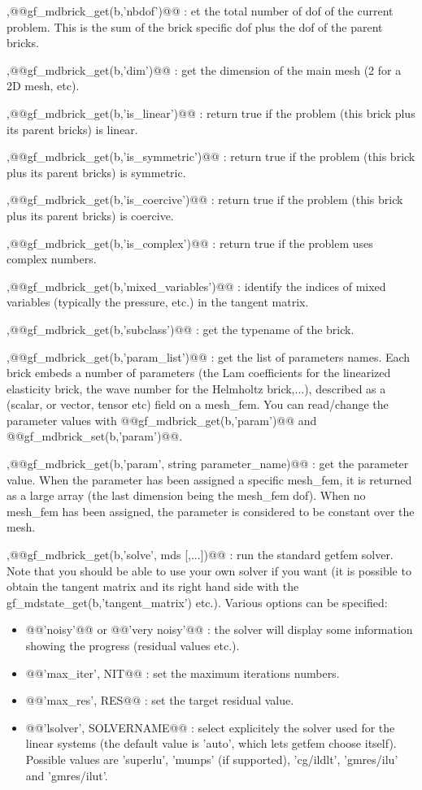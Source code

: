 \begin{cmddescription}    
  \sep{@@gf_mdbrick_get(b,'nbdof')@@} : et the total number of dof of
  the current problem.  This is the sum of the brick specific dof plus
  the dof of the parent bricks.

  \sep{@@gf_mdbrick_get(b,'dim')@@} : get the dimension of the main
  mesh (2 for a 2D mesh, etc).

  \sep{@@gf_mdbrick_get(b,'is_linear')@@} : return true if the problem (this brick plus its parent bricks) is linear.
  
  \sep{@@gf_mdbrick_get(b,'is_symmetric')@@} : return true if the
  problem (this brick plus its parent bricks) is symmetric.

  \sep{@@gf_mdbrick_get(b,'is_coercive')@@} : return true if the problem (this brick plus its parent bricks) is coercive.

  \sep{@@gf_mdbrick_get(b,'is_complex')@@} : return true if the problem uses complex numbers.

  \sep{@@gf_mdbrick_get(b,'mixed_variables')@@} : identify the
  indices of mixed variables (typically the pressure, etc.) in the
  tangent matrix.

  \sep{@@gf_mdbrick_get(b,'subclass')@@} : get the typename of the brick.

  \sep{@@gf_mdbrick_get(b,'param_list')@@} : get the list of
  parameters names.  Each brick embeds a number of parameters (the Lam
  coefficients for the linearized elasticity brick, the wave number
  for the Helmholtz brick,...), described as a (scalar, or vector,
  tensor etc) field on a mesh_fem. You can read/change the parameter
  values with @@gf_mdbrick_get(b,'param')@@ and
  @@gf_mdbrick_set(b,'param')@@.

  \sep{@@gf_mdbrick_get(b,'param', string parameter_name)@@} : 
  get the parameter value.  When the parameter has been assigned a specific
  mesh_fem, it is returned  as a large array (the last dimension being the
  mesh_fem dof). When no mesh_fem has been assigned, the parameter is considered
  to be constant over the mesh.

  \sep{@@gf_mdbrick_get(b,'solve', mds [,...])@@} :
  run the standard getfem solver.  Note that you should be able to use your own
    solver if you want (it is possible to obtain the tangent matrix and its right
    hand side with the gf_mdstate_get(b,'tangent_matrix') etc.).   Various
    options can be specified:
    \begin{itemize}
    \item @@'noisy'@@ or @@'very noisy'@@ : the solver will display
      some information showing the progress (residual values etc.). 
    \item @@'max_iter', NIT@@ : set the maximum iterations numbers. 
      \item @@'max_res', RES@@ :
    set the target residual value.
    \item @@'lsolver', SOLVERNAME@@  : select explicitely
    the solver used for the linear systems (the default value is 'auto', which
    lets getfem choose itself). Possible values are 'superlu', 'mumps' (if
    supported), 'cg/ildlt', 'gmres/ilu' and 'gmres/ilut'.
    \end{itemize}


\end{cmddescription}
